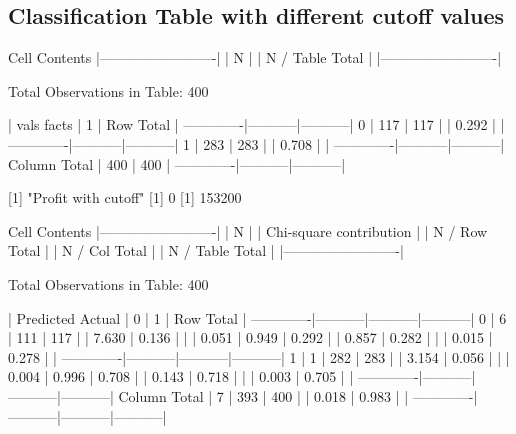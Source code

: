 \documentclass{article}
\begin{document}
\subsection{Classification Table with different cutoff values}
\begin{Schunk}
\begin{Soutput}
   Cell Contents
|-------------------------|
|                       N |
|         N / Table Total |
|-------------------------|

 
Total Observations in Table:  400 

 
             | vals 
       facts |         1 | Row Total | 
-------------|-----------|-----------|
           0 |       117 |       117 | 
             |     0.292 |           | 
-------------|-----------|-----------|
           1 |       283 |       283 | 
             |     0.708 |           | 
-------------|-----------|-----------|
Column Total |       400 |       400 | 
-------------|-----------|-----------|

 
[1] "Profit with cutoff"
[1] 0
[1] 153200

 
   Cell Contents
|-------------------------|
|                       N |
| Chi-square contribution |
|           N / Row Total |
|           N / Col Total |
|         N / Table Total |
|-------------------------|

 
Total Observations in Table:  400 

 
             | Predicted 
      Actual |         0 |         1 | Row Total | 
-------------|-----------|-----------|-----------|
           0 |         6 |       111 |       117 | 
             |     7.630 |     0.136 |           | 
             |     0.051 |     0.949 |     0.292 | 
             |     0.857 |     0.282 |           | 
             |     0.015 |     0.278 |           | 
-------------|-----------|-----------|-----------|
           1 |         1 |       282 |       283 | 
             |     3.154 |     0.056 |           | 
             |     0.004 |     0.996 |     0.708 | 
             |     0.143 |     0.718 |           | 
             |     0.003 |     0.705 |           | 
-------------|-----------|-----------|-----------|
Column Total |         7 |       393 |       400 | 
             |     0.018 |     0.983 |           | 
-------------|-----------|-----------|-----------|


\end{Soutput}
\end{Schunk}
\end{document}
